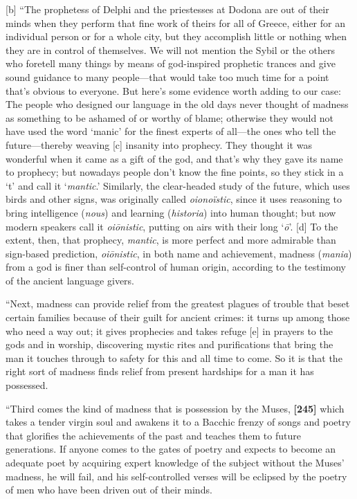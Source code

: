 {[}b{]} “The prophetess of Delphi and the priestesses at Dodona are out
of their minds when they perform that fine work of theirs for all of
Greece, either for an individual person or for a whole city, but they
accomplish little or nothing when they are in control of themselves. We
will not mention the Sybil or the others who foretell many things by
means of god-inspired prophetic trances and give sound guidance to many
people---that would take too much time for a point that's obvious to
everyone. But here's some evidence worth adding to our case: The people
who designed our language in the old days never thought of madness as
something to be ashamed of or worthy of blame; otherwise they would not
have used the word ‘manic' for the finest experts of all---the ones who
tell the future---thereby weaving {[}c{]} insanity into prophecy. They
thought it was wonderful when it came as a gift of the god, and that's
why they gave its name to prophecy; but nowadays people don't know the
fine points, so they stick in a ‘t' and call it ‘{\em mantic}.'
Similarly, the clear-headed study of the future, which uses birds and
other signs, was originally called {\em oionoïstic}, since it uses
reasoning to bring intelligence ({\em nous}) and learning
({\em historia}) into human thought; but now modern speakers call it
{\em oiōnistic}, putting on airs with their long ‘{\em ō}'. {[}d{]} To
the extent, then, that prophecy, {\em mantic}, is more perfect and more
admirable than sign-based prediction, {\em oiōnistic}, in both name and
achievement, madness ({\em mania}) from a god is finer than self-control
of human origin, according to the testimony of the ancient language
givers.

“Next, madness can provide relief from the greatest plagues of trouble
that beset certain families because of their guilt for ancient crimes:
it turns up among those who need a way out; it gives prophecies and
takes refuge {[}e{]} in prayers to the gods and in worship, discovering
mystic rites and purifications that bring the man it
touches through to
safety for this and all time to come. So it is that the right sort of
madness finds relief from present hardships for a man it has possessed.

“Third comes the kind of madness that is possession by the Muses,
{\bf {[}245{]}} which takes a tender virgin soul and awakens it to a
Bacchic frenzy of songs and poetry that glorifies the achievements of
the past and teaches them to future generations. If anyone comes to the
gates of poetry and expects to become an adequate poet by acquiring
expert knowledge of the subject without the Muses' madness, he will
fail, and his self-controlled verses will be eclipsed by the poetry of
men who have been driven out of their minds.

